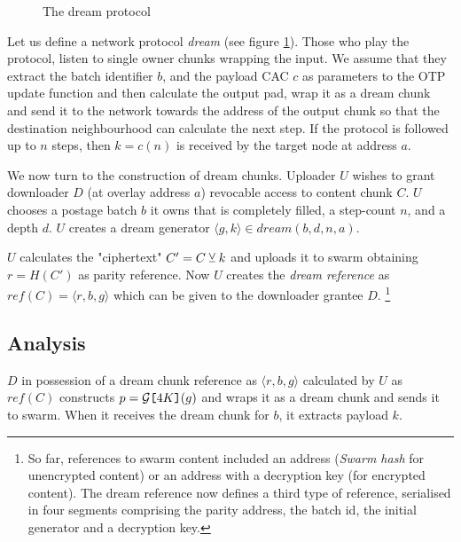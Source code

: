 \begin{figure}[htbp]
  \centering
  \caption{The dream protocol}
\label{fig:protocol}
\end{figure}


Let us  define a network protocol \emph{dream} (see figure \ref{fig:protocol}). Those who play the protocol, listen to single owner chunks wrapping the input.
We assume that they extract the batch identifier $b$, and the payload CAC $c$ as parameters to the OTP update function and then calculate the output pad, wrap it as a dream chunk and send it to the network towards the address of the output chunk so that the destination neighbourhood 
can calculate the next step. If the protocol is followed up to $n$ steps, then $k=c(n)$ is received by the target node at address $a$. 


We now turn to the construction of dream chunks. 
Uploader $U$ wishes to grant downloader $D$ (at overlay address $a$) revocable  access to content chunk $C$.
$U$  chooses a postage batch $b$ it owns that is completely filled, a step-count $n$, and a depth $d$.
$U$ creates a dream generator $\langle g, k\rangle\in\mathit{dream}(b,d,n,a)$.              

$U$ calculates the "ciphertext" $C'=C \veebar k$ and uploads it to swarm obtaining $r=\mathit{H}(C')$ as parity reference. Now $U$ creates the \emph{dream reference} as $\mathit{ref}(C)=\langle r,b,g\rangle $ which can be given to the downloader grantee $D$.%
%
\footnote{So far, references to swarm content included an address (\emph{Swarm hash} for unencrypted content) or an address with a decryption key (for encrypted content). The dream reference now defines a third type of reference, serialised in four segments comprising the parity address, the batch id, the initial generator and a decryption key.}

\subsection{Analysis}

$D$ in possession of a dream chunk reference as 
$\langle r,b,g\rangle $ calculated by $U$  as $\mathit{ref}(C)$ constructs $p=\mathcal{G}\texttt{[}\/4K\/\texttt{]}(g)$ and wraps it as a dream chunk and sends it to swarm. When it receives the dream chunk for $b$, it extracts payload $k$.


